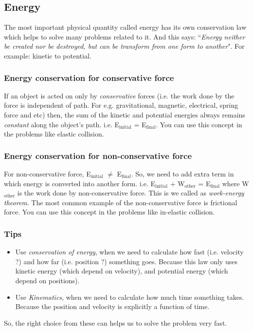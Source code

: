 \documentclass[12pt,a4paper]{article}
\begin{document}
\subsection{Energy}

The most important physical quantity called energy has its own conservation law which helps to solve many problems related to it. And this says: ``\emph{Energy neither be created nor be destroyed, but can be transform from one form to another}". For example: kinetic to potential.

\subsubsection{Energy conservation for conservative force} \label{ecf}

If an object is acted on only by \emph{conservative} forces (i.e. the work done by the force is independent of path. For e.g. gravitational, magnetic, electrical, spring force and etc) then, the sum of the kinetic and potential energies always remains \emph{constant} along the object's path. i.e. E$_\text{initial}$ = E$_\text{final}$. You can use this concept in the problems like elastic collision.

\subsubsection{Energy conservation for non-conservative force}

For non-conservative force, E$_\text{initial}$ $\neq$ E$_\text{final}$. So, we need to add extra term in which energy is converted into another form. i.e. E$_\text{initial}$ + W$_\text{other}$ = E$_\text{final}$ where W$_\text{other}$ is the work done by non-conservative force. This is we called as \emph{work-energy theorem}. The most common example of the non-conservative force is frictional force. You can use this concept in the problems like in-elastic collision.

\subsubsection*{Tips}
\begin{itemize}
\item Use \emph{conservation of energy}, when we need to calculate how fast (i.e. velocity ?) and how far (i.e. position ?) something goes. Because this law only uses kinetic energy (which depend on velocity), and potential energy (which depend on positions).
\item Use \emph{Kinematics}, when we need to calculate how much time something takes. Because the position and velocity is explicitly a function of time.
\end{itemize}
So, the right choice from these can helps us to solve the problem very fast.
\end{document}
